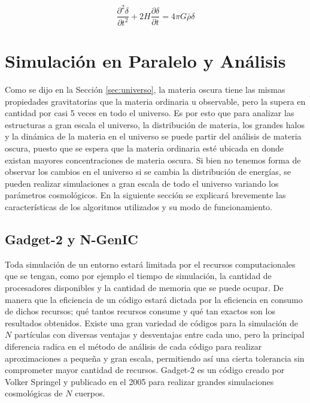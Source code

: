 \begin{equation}
\frac{\partial^{2}\delta}{\partial t^{2}}+2H\frac{\partial\delta}{\partial t}=4\pi G\bar{\rho}\delta
\label{eq:diff}
\end{equation}



\section{Simulación en Paralelo y Análisis}
Como se dijo en la Sección \ref{sec:universo}, la materia oscura tiene las mismas propiedades gravitatorias que la materia ordinaria u observable, pero la supera en cantidad por casi 5 veces en todo el universo. Es por esto que para analizar las estructuras a gran escala el universo, la distribución de materia, los grandes halos y la dinámica de la materia en el universo se puede partir del análisis de materia oscura, puesto que se espera que la materia ordinaria esté ubicada en donde existan mayores concentraciones de materia oscura. Si bien no tenemos forma de observar los cambios en el universo si se cambia la distribución de energías, se pueden realizar simulaciones a gran escala de todo el universo variando los parámetros cosmológicos. En la siguiente sección se explicará brevemente las características de los algoritmos utilizados y su modo de funcionamiento.


\subsection{Gadget-2 y N-GenIC}

Toda simulación de un entorno estará limitada por el recursos computacionales que se tengan, como por ejemplo el tiempo de simulación, la cantidad de procesadores disponibles y la cantidad de memoria que se puede ocupar. De manera que la eficiencia de un código estará dictada por la eficiencia en consumo de dichos recursos; qué tantos recursos consume y qué tan exactos son los resultados obtenidos. Existe una gran variedad de códigos para la simulación de $N$ partículas con diversas ventajas y desventajas entre cada uno, pero la principal diferencia radica en el método de análisis de cada código para realizar aproximaciones a pequeña y gran escala, permitiendo así una cierta tolerancia sin comprometer mayor cantidad de recursos. Gadget-2 es un código creado por Volker Springel y publicado en el 2005\cite{gadget} para realizar grandes simulaciones cosmológicas de $N$ cuerpos. 


